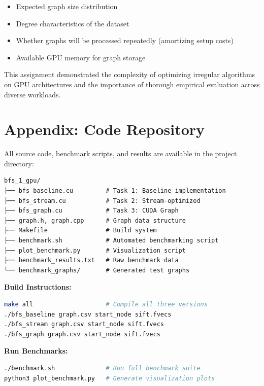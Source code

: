 \documentclass[11pt,a4paper]{article}
\begin{document}
\begin{itemize}
    \item Expected graph size distribution
    \item Degree characteristics of the dataset
    \item Whether graphs will be processed repeatedly (amortizing setup costs)
    \item Available GPU memory for graph storage
\end{itemize}

This assignment demonstrated the complexity of optimizing irregular algorithms on GPU architectures and the importance of thorough empirical evaluation across diverse workloads.

\section*{Appendix: Code Repository}

All source code, benchmark scripts, and results are available in the project directory:

\begin{verbatim}
bfs_1_gpu/
├── bfs_baseline.cu         # Task 1: Baseline implementation
├── bfs_stream.cu           # Task 2: Stream-optimized
├── bfs_graph.cu            # Task 3: CUDA Graph
├── graph.h, graph.cpp      # Graph data structure
├── Makefile                # Build system
├── benchmark.sh            # Automated benchmarking script
├── plot_benchmark.py       # Visualization script
├── benchmark_results.txt   # Raw benchmark data
└── benchmark_graphs/       # Generated test graphs
\end{verbatim}

\textbf{Build Instructions:}
\begin{lstlisting}[language=bash]
make all                    # Compile all three versions
./bfs_baseline graph.csv start_node sift.fvecs
./bfs_stream graph.csv start_node sift.fvecs
./bfs_graph graph.csv start_node sift.fvecs
\end{lstlisting}

\textbf{Run Benchmarks:}
\begin{lstlisting}[language=bash]
./benchmark.sh              # Run full benchmark suite
python3 plot_benchmark.py   # Generate visualization plots
\end{lstlisting}
\end{document}
